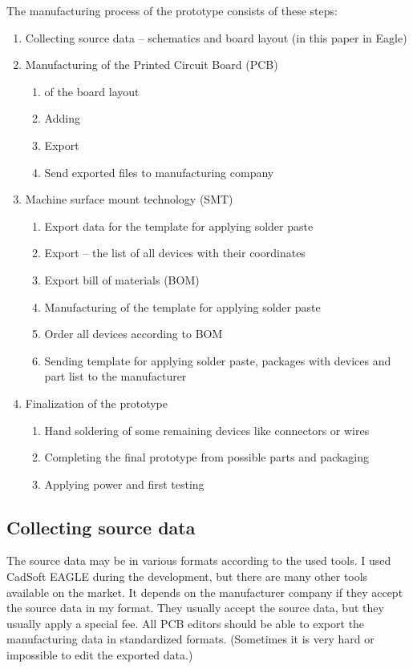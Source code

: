 The manufacturing process of the prototype consists of these steps:
\begin{enumerate}
    \item Collecting source data -- schematics and board layout (in this paper in Eagle)
    \item Manufacturing of the Printed Circuit Board (\ac{PCB})
    \begin{enumerate}
        \item {} of the board layout
        \item Adding 
        \item Export 
        \item Send exported files to manufacturing company
    \end{enumerate}
    \item Machine surface mount technology (\ac{SMT})
    \begin{enumerate}
        \item Export data for the template for applying solder paste
        \item Export  -- the list of all devices with their coordinates
        \item Export bill of materials (\ac{BOM})
        \item Manufacturing of the template for applying solder paste
        \item Order all devices according to \ac{BOM}
        \item Sending template for applying solder paste, packages with devices and part list to the manufacturer
    \end{enumerate}
    \item Finalization of the prototype
    \begin{enumerate}
        \item Hand soldering of some remaining devices like connectors or wires
        \item Completing the final prototype from possible parts and packaging
        \item Applying power and first testing
    \end{enumerate}
\end{enumerate}

\subsection{Collecting source data}
The source data may be in various formats according to the used tools. I used CadSoft \ac{EAGLE} \cite{EAGLE} during the development, but there are many other tools available on the market. It depends on the manufacturer company if they accept the source data in my format. They usually accept the source data, but they usually apply a special fee. All \ac{PCB} editors should be able to export the manufacturing data in standardized formats. (Sometimes it is very hard or impossible to edit the exported data.)

